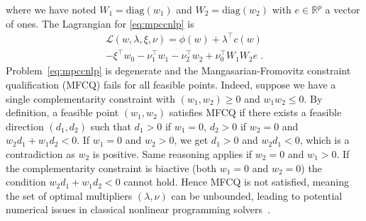 \documentclass{IEEEtran4PSCC}
\newcommand{\add}[1]{#1}
\begin{document}
where we have noted $W_1 = \text{diag}(w_1)$ and $W_2 = \text{diag}(w_2)$ with $e \in \mathbb{R}^p$
a vector of ones.
The Lagrangian for \eqref{eq:mpccnlp} is
\begin{multline}
  \mathcal{L}(w, \lambda, \xi, \nu) = \phi(w) + \lambda^\top c(w) \\ - \xi^\top w_0 - \nu_1^\top w_1 - \nu_2^\top w_2 + \nu_0^\top W_1 W_2 e \; .
\end{multline}
\add{Problem~\eqref{eq:mpccnlp} is degenerate and the Mangasarian-Fromovitz constraint qualification (MFCQ)
fails for all feasible points. Indeed, suppose we have a single complementarity
constraint with $(w_1, w_2) \geq 0$ and $w_1 w_2 \leq 0$. By definition, a feasible point $(w_1, w_2)$ satisfies
MFCQ if there exists a feasible direction $(d_1, d_2)$ such that $d_1 > 0$ if $w_1 = 0$, $d_2 > 0$ if
$w_2 = 0$ and $w_2 d_1 + w_1 d_2 < 0$. If $w_1 = 0$ and $w_2 > 0$, we get $d_1 > 0$ and $w_2 d_1 < 0$,
which is a contradiction as $w_2$ is positive. Same reasoning applies if $w_2 = 0$ and $w_1 > 0$.
If the complementarity constraint
is biactive (both $w_1 = 0$ and $w_2 = 0$) the condition $w_2 d_1 + w_1 d_2 < 0$ cannot hold.
Hence MFCQ is not satisfied, meaning the set of optimal multipliers $(\lambda, \nu)$ can be unbounded,
leading to potential numerical issues in
classical nonlinear programming solvers~\cite{leyffer2006interior}.}
\end{document}
